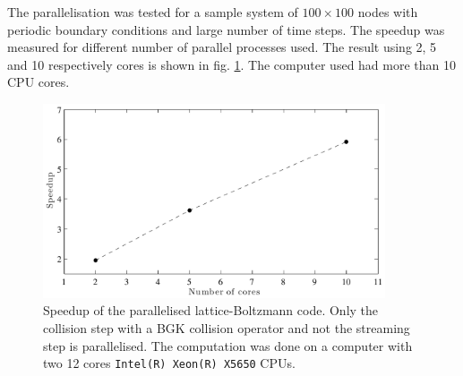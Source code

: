 The parallelisation was tested for a sample system of $100 \times 100$
nodes with periodic boundary conditions and large number of time
steps. The speedup was measured for different number of parallel
processes used. The result using 2, 5 and 10 respectively cores is
shown in fig. \ref{fig:hpc:para}. The computer used had more than 10
CPU cores. 

\begin{figure}
\begin{center}
\includegraphics[width=0.9\textwidth]{fig/para.pdf}
\end{center}
\caption{Speedup of the parallelised lattice-Boltzmann code. Only the
  collision step with a BGK collision operator and not the streaming
  step is parallelised. The computation was done on a computer with
  two 12 cores \texttt{Intel(R) Xeon(R) X5650} CPUs.}
\label{fig:hpc:para}
\end{figure}


